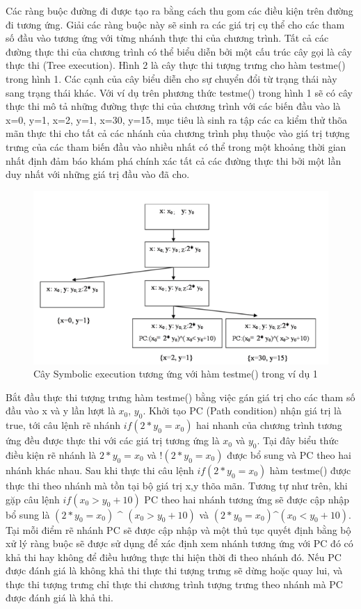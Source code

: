 \documentclass[12pt,a4paper]{article}
\begin{document}
\indent Các ràng buộc đường đi được tạo ra bằng cách thu gom các điều kiện trên đường đi tương ứng. Giải các ràng buộc này sẽ sinh ra các giá trị cụ thể cho các tham số đầu vào tương ứng với từng nhánh thực thi của chương trình.\newline
\indent Tất cả các đường thực thi của chương trình có thể biểu diễn bởi một cấu trúc cây gọi là cây thực thi (Tree execution). Hình 2 là cây thực thi tượng trưng cho hàm testme() trong hình 1. Các cạnh của cây biểu diễn cho sự chuyển đổi từ trạng thái này sang trạng thái khác. Với ví dụ trên phương thức testme() trong hình 1 sẽ có cây thực thi mô tả những đường thực thi của chương trình với các biến đầu vào là {x=0, y=1}, {x=2, y=1}, {x=30, y=15}, mục tiêu là sinh ra tập các ca kiểm thử thõa mãn thực thi cho tất cả các nhánh của chương trình phụ thuộc vào giá trị tượng trưng của các tham biến đầu vào nhiều nhất có thể trong một khoảng thời gian nhất định đảm báo khám phá chính xác tất cả các đường thực thi bởi một lần duy nhất với những giá trị đầu vào đã cho.\newline
\begin{figure}[ht]
\begin{center}
\includegraphics{hinhanh/hinh2}
\end{center}
\caption{Cây Symbolic execution tương ứng với hàm testme() trong ví dụ 1}
\end{figure}
\indent Bắt đầu thực thi tượng trưng hàm testme() bằng việc gán giá trị cho các tham số đầu vào x và y lần lượt là $x_0$, $y_0$. Khởi tạo PC (Path condition) nhận giá trị là true, tới câu lệnh rẽ nhánh $if(2*y_0=x_0)$ hai nhanh của chương trình tương ứng đều được thực thi với các giá trị tương ứng là $x_0$ và $y_0$. Tại đây biểu thức điều kiện rẽ nhánh là $2*y_0=x_0$ và $!(2*y_0=x_0)$ được bổ sung và PC theo hai nhánh khác nhau. Sau khi thực thi câu lệnh $if(2*y_0=x_0)$ hàm testme() được thực thi theo nhánh mà tồn tại bộ giá trị x,y thõa mãn. Tương tự như trên, khi gặp câu lệnh $if(x_0>y_0+10)$ PC theo hai nhánh tương ứng sẽ được cập nhập bổ sung là $(2*y_0=x_0)$ \^{} $(x_0>y_0+10)$ và $(2*y_0=x_0)$\^{}$(x_0<y_0+10)$. Tại mỗi điểm rẽ nhánh PC sẽ được cập nhập và một thủ tục quyết định bằng bộ xử lý ràng buộc sẽ được sử dụng để xác định xem nhánh tương ứng với PC đó có khả thi hay không để điều hướng thực thi hiện thời đi theo nhánh đó. Nếu PC được đánh giá là không khả thi thực thi tượng trưng sẽ dừng hoặc quay lui, và thực thi tượng trưng chỉ thực thi chương trình tượng trưng theo nhánh mà PC được đánh giá là khả thi.\newline
\end{document}
